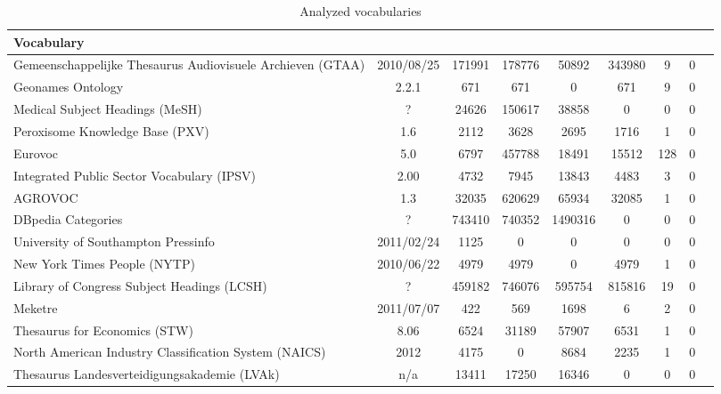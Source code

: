 \begin{table}[h]
\label{tab:vocs}
\caption{Analyzed vocabularies}
\centering
\begin{tabular}{p{6cm}ccccccc}
\textbf{Vocabulary} &  &  &  &  &  &  &  & \\
\toprule
Gemeenschappelijke Thesaurus Audiovisuele Archieven (GTAA) & 2010/08/25 & 171991 & 178776 & 50892 & 343980 & 9 & 0 \\
\hline
Geonames Ontology & 2.2.1 & 671 & 671 & 0 & 671 & 9 & 0 \\
\hline
Medical Subject Headings (MeSH) & ? & 24626 & 150617 & 38858 & 0 & 0 & 0 \\
\hline
Peroxisome Knowledge Base (PXV) & 1.6 & 2112 & 3628 & 2695 & 1716 & 1 & 0 \\
\hline
Eurovoc & 5.0 & 6797 & 457788 & 18491 & 15512 & 128 & 0 \\
\hline
Integrated Public Sector Vocabulary (IPSV) & 2.00 & 4732 & 7945 & 13843 & 4483 & 3 & 0 \\
\hline
AGROVOC & 1.3 & 32035 & 620629 & 65934 & 32085 & 1 & 0 \\
\hline
DBpedia Categories & ? & 743410 & 740352 & 1490316 & 0 & 0 & 0 \\
\hline
University of Southampton Pressinfo & 2011/02/24 & 1125 & 0 & 0 & 0 & 0 & 0 \\
\hline
New York Times People (NYTP) & 2010/06/22 & 4979 & 4979 & 0 & 4979 & 1 & 0 \\
\hline
Library of Congress Subject Headings (LCSH) & ? & 459182 & 746076 & 595754 & 815816 & 19 & 0 \\
\hline
Meketre & 2011/07/07 & 422 & 569 & 1698 & 6 & 2 & 0 \\
\hline
Thesaurus for Economics (STW) & 8.06 & 6524 & 31189 & 57907 & 6531 & 1 & 0 \\
\hline
North American Industry Classification System (NAICS) & 2012 & 4175 & 0 & 8684 & 2235 & 1 & 0 \\
\hline
Thesaurus Landesverteidigungsakademie (LVAk) & n/a & 13411 & 17250 & 16346 & 0 & 0 & 0 \\
\bottomrule
\end{tabular}
\label{vocabs}
\end{table}

